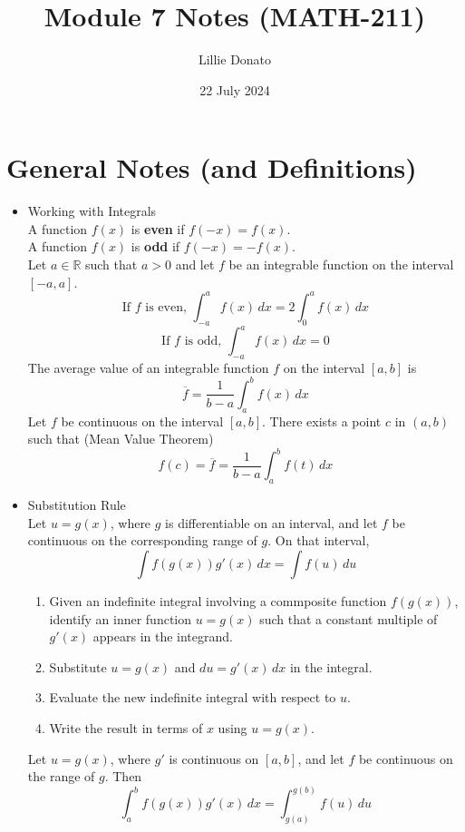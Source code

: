 \documentclass{article}
\title{Module 7 Notes (MATH-211)}
\author{Lillie Donato}
\date{22 July 2024}
\begin{document}
\maketitle

\section*{General Notes (and Definitions)}
\begin{itemize}
    \item Working with Integrals \\
        A function $f(x)$ is \textbf{even} if $f(-x) = f(x)$. \\
        A function $f(x)$ is \textbf{odd} if $f(-x) = -f(x)$. \\
        Let $a \in \mathbb{R}$ such that $a > 0$ and let $f$ be an integrable function on the interval $[-a,a]$.
        $$\text{If } f \text{ is even, } \int_{-a}^a{f(x)\,dx} = 2\int_0^a{f(x)\,dx}$$
        $$\text{If } f \text{ is odd, } \int_{-a}^a{f(x)\,dx} = 0$$
        The average value of an integrable function $f$ on the interval $[a,b]$ is
        $$\overline{f} = \frac{1}{b - a}\int_a^b{f(x)\,dx}$$
        Let $f$ be continuous on the interval $[a,b]$. There exists a point $c$ in $(a,b)$ such that (Mean Value Theorem)
        $$f(c) = \overline{f} = \frac{1}{b - a}\int_a^b{f(t)\,dx}$$
    \item Substitution Rule \\
        Let $u = g(x)$, where $g$ is differentiable on an interval, and let $f$ be continuous on the corresponding range of $g$. On that interval,
        $$\int{f(g(x))g'(x)\,dx} = \int{f(u)\,du}$$
        \begin{enumerate}
            \item Given an indefinite integral involving a commposite function $f(g(x))$, identify an inner function $u = g(x)$ such that a constant multiple of $g'(x)$ appears in the integrand.
            \item Substitute $u = g(x)$ and $du = g'(x)\,dx$ in the integral.
            \item Evaluate the new indefinite integral with respect to $u$.
            \item Write the result in terms of $x$ using $u = g(x)$.
        \end{enumerate}
        Let $u = g(x)$, where $g'$ is continuous on $[a,b]$, and let $f$ be continuous on the range of $g$. Then
        $$\int_a^b{f(g(x))g'(x)\,dx} = \int_{g(a)}^{g(b)}{f(u)\,du}$$
\end{itemize}
\end{document}
